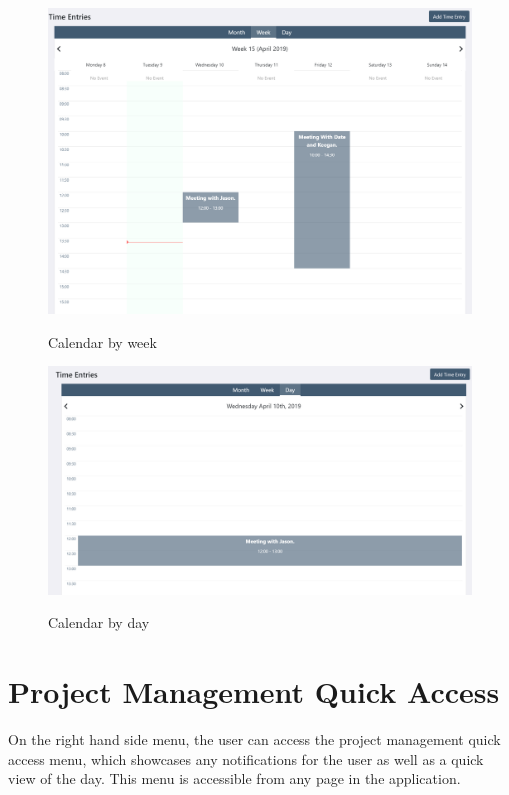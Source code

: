{{\begin{figure}[H]
	\centering
	\includegraphics[width=5in]{calendar-week.png}\\
	\caption{Calendar by week}
	\label{fig:tobias}
\end{figure}

\begin{figure}[H]
	\centering
	\includegraphics[width=5in]{calendar-day.png}\\
	\caption{Calendar by day}
	\label{fig:tobias}
\end{figure}

\newpage
\section{Project Management Quick Access}
On the right hand side menu, the user can access the project management quick access menu, which showcases any notifications for the user as well as a quick view of the day. This menu is accessible from any page in the application.
\newline
{\setlength{\parindent}{0cm}

}}}
